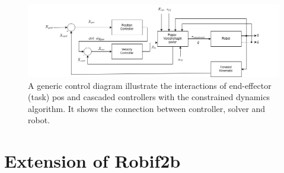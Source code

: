 \documentclass[report.tex]{subfiles}
\begin{document}
    \begin{figure}[h]
        \centering
        \includegraphics[width=1\linewidth]{images/systemdia.png}
        \caption{A generic control diagram illustrate the interactions of end-effector (task)
        pos and cascaded controllers with the constrained dynamics
        algorithm. It shows the connection between controller, solver and robot.}
        \label{fig:sys}
    \end{figure}
    \section{Extension of Robif2b}
\end{document}
